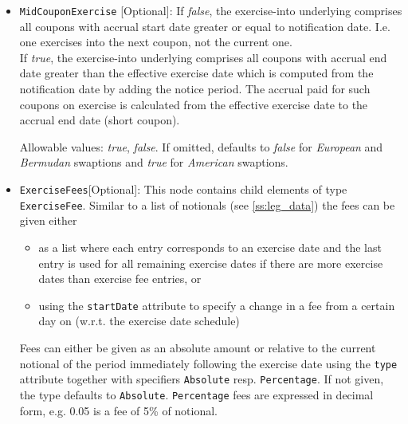 \begin{itemize}
\emph{PhysicalOTC} = OTC traded swaptions with physical settlement\\
\emph{PhysicalCleared} = Cleared swaptions with physical settlement\\
\emph{CollateralizedCashPrice} = Cash settled swaptions with settlement price calculation using zero coupon curve discounting \\
\emph{ParYieldCurve}  = Cash settled swaptions with settlement price calculation using par yield discounting \footnote{https://www.isda.org/book/2006-isda-definitions/} \footnote{https://www.isda.org/a/TlAEE/Supplement-No-58-to-ISDA-2006-Definitions.pdf} \\

\item \lstinline!MidCouponExercise! [Optional]:   If \emph{false}, the exercise-into underlying comprises all coupons with accrual start date greater or equal to notification date. I.e. one exercises into the next coupon, not the current one.\\
If \emph{true}, the exercise-into underlying 
comprises all coupons with accrual end date greater than the effective exercise date which is computed from the notification date by adding the notice period. 
The accrual paid for such coupons on exercise is calculated from the effective exercise date to the accrual end date (short coupon).

Allowable values: \emph{true}, \emph{false}. If omitted, defaults to \emph{false} for \emph{European} and \emph{Bermudan} swaptions and \emph{true} for \emph{American} swaptions.


\item \lstinline!ExerciseFees![Optional]: This node contains child elements of type \lstinline!ExerciseFee!. Similar to a list of notionals
  (see \ref{ss:leg_data}) the fees can be given either

  \begin{itemize}
  \item as a list where each entry corresponds to an exercise date and the last entry is used for all remaining exercise
    dates if there are more exercise dates than exercise fee entries, or
  \item using the \verb+startDate+ attribute to specify a change in a fee from a certain day on (w.r.t. the exercise
    date schedule)
  \end{itemize}

  Fees can either be given as an absolute amount or relative to the current notional of the period immediately following
  the exercise date using the \verb+type+ attribute together with specifiers \verb+Absolute+ resp. \verb+Percentage+. If
  not given, the type defaults to \verb+Absolute+. \verb+Percentage+ fees are expressed in decimal form, e.g. 0.05 is a fee of 5\% of notional.


\end{itemize}
